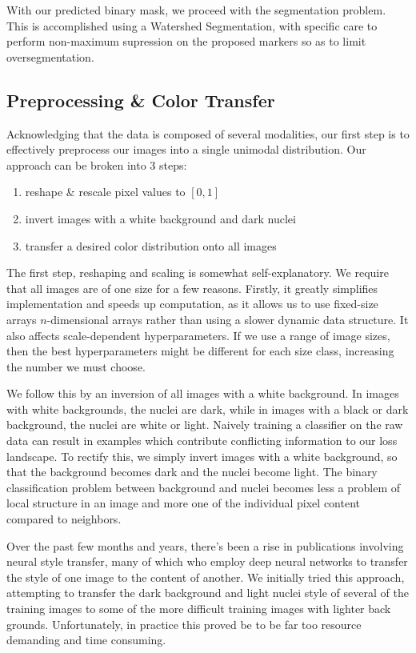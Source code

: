 \documentclass[paper=letter, fontsize=12pt]{article}
\numberwithin{equation}{section} %
\numberwithin{figure}{section} %
\numberwithin{table}{section} %
\begin{document}
With our predicted binary mask, we proceed with the segmentation problem.  This
is accomplished using a Watershed Segmentation, with specific care to perform
non-maximum supression on the proposed markers so as to limit oversegmentation.

\subsection{Preprocessing \& Color Transfer}

Acknowledging that the data is composed of several modalities, our first step
is to effectively preprocess our images into a single unimodal distribution.
Our approach can be broken into 3 steps:
\begin{enumerate}
    \item reshape \& rescale pixel values to $[0, 1]$
    \item invert images with a white background and dark nuclei
    \item transfer a desired color distribution onto all images
\end{enumerate}

The first step, reshaping and scaling is somewhat self-explanatory.  We require
that all images are of one size for a few reasons.  Firstly, it greatly
simplifies implementation and speeds up computation, as it allows us to use
fixed-size arrays $n$-dimensional arrays rather than using a slower dynamic
data structure.  It also affects scale-dependent hyperparameters.  If we use a
range of image sizes, then the best hyperparameters might be different for each
size class, increasing the number we must choose.

We follow this by an inversion of all images with a white background.  In
images with white backgrounds, the nuclei are dark, while in images with a
black or dark background, the nuclei are white or light.  Naively training a
classifier on the raw data can result in examples which contribute conflicting
information to our loss landscape.  To rectify this, we simply invert images
with a white background, so that the background becomes dark and the nuclei
become light.  The binary classification problem between background and nuclei
becomes less a problem of local structure in an image and more one of
the individual pixel content compared to neighbors.

Over the past few months and years, there's been a rise in publications
involving neural style transfer, many of which who employ deep neural networks
to transfer the style of one image to the content of another. We initially
tried this approach, attempting to transfer the dark background and light
nuclei style of several of the training images to some of the more difficult
training images with lighter back grounds. Unfortunately, in practice this
proved be to be far too resource demanding and time consuming.
\end{document}
